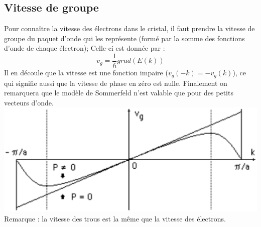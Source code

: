 \subsection{Vitesse de groupe}
Pour connaître la vitesse des électrons dans le cristal, il faut prendre la vitesse de groupe du paquet d'onde qui les représente (formé par la somme des fonctions d'onde de chaque électron); Celle-ci est donnée par :
\begin{equation}
v_g=\frac{1}{\hbar}grad(E(k))
\end{equation}
Il en découle que la vitesse est une fonction impaire  ($v_g(-k)=-v_g(k)$), ce qui signifie aussi que la vitesse de phase en zéro est nulle. %
Finalement on remarquera que le modèle de Sommerfeld n'est valable que pour des petits vecteurs d'onde. 
\\\includegraphics[scale=0.4]{vitesse.eps} \\
Remarque : la vitesse des trous est la même que la vitesse des électrons.
